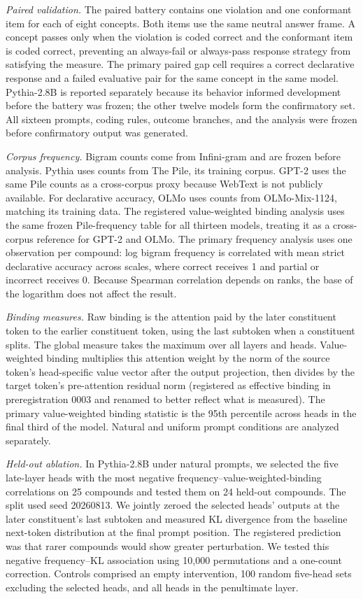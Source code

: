 \documentclass[
  english,
]{article}
\begin{document}
\emph{Paired validation.} The paired battery contains one violation and one conformant item for each of eight concepts. Both items use the same neutral answer frame. A concept passes only when the violation is coded correct and the conformant item is coded correct, preventing an always-fail or always-pass response strategy from satisfying the measure. The primary paired gap cell requires a correct declarative response and a failed evaluative pair for the same concept in the same model. Pythia-2.8B is reported separately because its behavior informed development before the battery was frozen; the other twelve models form the confirmatory set. All sixteen prompts, coding rules, outcome branches, and the analysis were frozen before confirmatory output was generated.

\emph{Corpus frequency.} Bigram counts come from Infini-gram \citep{liu2024infinigram} and are frozen before analysis. Pythia uses counts from The Pile, its training corpus. GPT-2 uses the same Pile counts as a cross-corpus proxy because WebText is not publicly available. For declarative accuracy, OLMo uses counts from OLMo-Mix-1124, matching its training data. The registered value-weighted binding analysis uses the same frozen Pile-frequency table for all thirteen models, treating it as a cross-corpus reference for GPT-2 and OLMo. The primary frequency analysis uses one observation per compound: log bigram frequency is correlated with mean strict declarative accuracy across scales, where correct receives 1 and partial or incorrect receives 0. Because Spearman correlation depends on ranks, the base of the logarithm does not affect the result.

\emph{Binding measures.} Raw binding is the attention paid by the later constituent token to the earlier constituent token, using the last subtoken when a constituent splits. The global measure takes the maximum over all layers and heads. Value-weighted binding multiplies this attention weight by the norm of the source token's head-specific value vector after the output projection, then divides by the target token's pre-attention residual norm (registered as effective binding in preregistration 0003 and renamed to better reflect what is measured). The primary value-weighted binding statistic is the 95th percentile across heads in the final third of the model. Natural and uniform prompt conditions are analyzed separately.

\emph{Held-out ablation.} In Pythia-2.8B under natural prompts, we selected the five late-layer heads with the most negative frequency--value-weighted-binding correlations on 25 compounds and tested them on 24 held-out compounds. The split used seed 20260813. We jointly zeroed the selected heads' outputs at the later constituent's last subtoken and measured KL divergence from the baseline next-token distribution at the final prompt position. The registered prediction was that rarer compounds would show greater perturbation. We tested this negative frequency--KL association using 10,000 permutations and a one-count correction. Controls comprised an empty intervention, 100 random five-head sets excluding the selected heads, and all heads in the penultimate layer.
\end{document}
